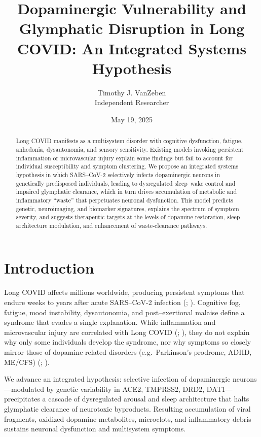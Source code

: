 \documentclass[12pt]{article}
\title{Dopaminergic Vulnerability and Glymphatic Disruption in Long COVID: An Integrated Systems Hypothesis}
\author{Timothy J. VanZeben\\Independent Researcher}
\date{May 19, 2025}
\begin{document}
\maketitle

\begin{abstract}
Long COVID manifests as a multisystem disorder with cognitive dysfunction, fatigue, anhedonia, dysautonomia, and sensory sensitivity.  Existing models invoking persistent inflammation or microvascular injury explain some findings but fail to account for individual susceptibility and symptom clustering.  We propose an integrated systems hypothesis in which SARS–CoV-2 selectively infects dopaminergic neurons in genetically predisposed individuals, leading to dysregulated sleep–wake control and impaired glymphatic clearance, which in turn drives accumulation of metabolic and inflammatory “waste” that perpetuates neuronal dysfunction.  This model predicts genetic, neuroimaging, and biomarker signatures, explains the spectrum of symptom severity, and suggests therapeutic targets at the levels of dopamine restoration, sleep architecture modulation, and enhancement of waste‐clearance pathways.
\end{abstract}

\section{Introduction}
\label{sec:intro}
Long COVID affects millions worldwide, producing persistent symptoms that endure weeks to years after acute SARS–CoV-2 infection (\citealp{Davis2021}; \citealp{Graham2021}).  Cognitive fog, fatigue, mood instability, dysautonomia, and post–exertional malaise define a syndrome that evades a single explanation.  While inflammation and microvascular injury are correlated with Long COVID (\citealp{Yang2021}; \citealp{Crunfli2023}), they do not explain why only some individuals develop the syndrome, nor why symptoms so closely mirror those of dopamine‐related disorders (e.g.\ Parkinson’s prodrome, ADHD, ME/CFS) (\citealp{Devine2022}; \citealp{Gizer2009}).  

We advance an integrated hypothesis: selective infection of dopaminergic neurons—modulated by genetic variability in ACE2, TMPRSS2, DRD2, DAT1—precipitates a cascade of dysregulated arousal and sleep architecture that halts glymphatic clearance of neurotoxic byproducts.  Resulting accumulation of viral fragments, oxidized dopamine metabolites, microclots, and inflammatory debris sustains neuronal dysfunction and multisystem symptoms.
\end{document}
